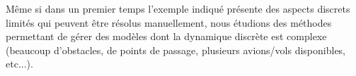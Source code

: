 Même si dans un premier temps l'exemple indiqué présente des aspects discrets limités qui peuvent être résolus manuellement, nous étudions des méthodes permettant de gérer des modèles dont la dynamique discrète est complexe (beaucoup d'obstacles, de points de passage, plusieurs avions/vols disponibles, etc...).

%
%		
%		
%		
%		
%		
%		



